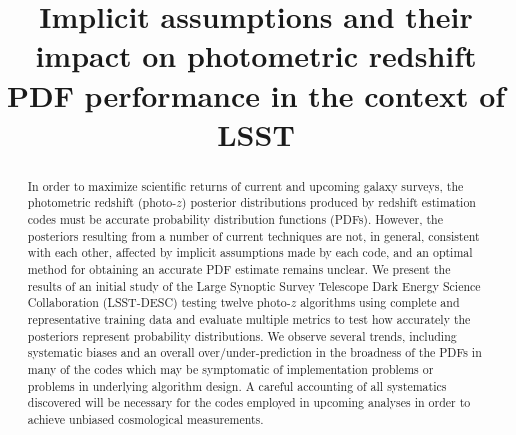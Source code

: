 \documentclass[\docopts]{\docclass}
\begin{document}
\linenumbers

\title{Implicit assumptions and their impact on photometric redshift PDF performance in the context of LSST}

\maketitlepre

\begin{abstract}

In order to maximize scientific returns of current and upcoming galaxy surveys, the photometric redshift (photo-$z$) posterior distributions produced by redshift estimation codes must be accurate probability distribution functions (PDFs).  However, the posteriors resulting from a number of current techniques are not, in general, consistent with each other, affected by implicit assumptions made by each code, and an optimal method for obtaining an accurate PDF estimate remains unclear.   We present the results of an initial study of the Large Synoptic Survey Telescope Dark Energy Science Collaboration (\textsc{LSST-DESC}) testing twelve photo-$z$ algorithms using complete and representative training data and evaluate multiple metrics to test how accurately the posteriors represent probability distributions.  We observe several trends, including systematic biases and an overall over/under-prediction in the broadness of the PDFs in many of the codes which may be symptomatic of implementation problems or problems in underlying algorithm design.  A careful accounting of all systematics discovered will be necessary for the codes employed in upcoming analyses in order to achieve unbiased cosmological measurements.
  

\end{abstract}
\end{document}
